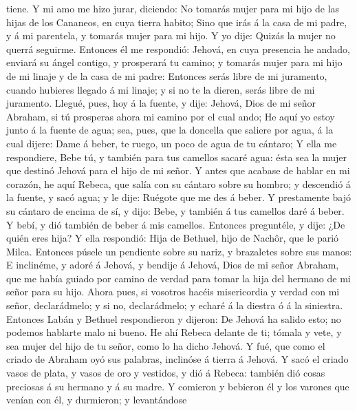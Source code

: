 tiene.  Y mi amo me hizo jurar, diciendo: No tomarás
mujer para mi hijo de las hijas de los Cananeos, en cuya tierra habito;
 Sino que irás á la casa de mi padre, y á mi parentela, y
tomarás mujer para mi hijo.  Y yo dije: Quizás la mujer
no querrá seguirme.  Entonces él me respondió: Jehová, en
cuya presencia he andado, enviará su ángel contigo, y prosperará tu
camino; y tomarás mujer para mi hijo de mi linaje y de la casa de mi
padre:  Entonces serás libre de mi juramento, cuando
hubieres llegado á mi linaje; y si no te la dieren, serás libre de mi
juramento.  Llegué, pues, hoy á la fuente, y dije:
Jehová, Dios de mi señor Abraham, si tú prosperas ahora mi camino por el
cual ando;  He aquí yo estoy junto á la fuente de agua;
sea, pues, que la doncella que saliere por agua, á la cual dijere: Dame
á beber, te ruego, un poco de agua de tu cántaro;  Y ella
me respondiere, Bebe tú, y también para tus camellos sacaré agua: ésta
sea la mujer que destinó Jehová para el hijo de mi señor.
 Y antes que acabase de hablar en mi corazón, he aquí
Rebeca, que salía con su cántaro sobre su hombro; y descendió á la
fuente, y sacó agua; y le dije: Ruégote que me des á beber.
 Y prestamente bajó su cántaro de encima de sí, y dijo:
Bebe, y también á tus camellos daré á beber. Y bebí, y dió también de
beber á mis camellos.  Entonces preguntéle, y dije: ¿De
quién eres hija? Y ella respondió: Hija de Bethuel, hijo de Nachôr, que
le parió Milca. Entonces púsele un pendiente sobre su nariz, y
brazaletes sobre sus manos:  E inclinéme, y adoré á
Jehová, y bendije á Jehová, Dios de mi señor Abraham, que me había
guiado por camino de verdad para tomar la hija del hermano de mi señor
para su hijo.  Ahora pues, si vosotros hacéis
misericordia y verdad con mi señor, declarádmelo; y si no, declarádmelo;
y echaré á la diestra ó á la siniestra.  Entonces Labán y
Bethuel respondieron y dijeron: De Jehová ha salido esto; no podemos
hablarte malo ni bueno.  He ahí Rebeca delante de ti;
tómala y vete, y sea mujer del hijo de tu señor, como lo ha dicho
Jehová.  Y fué, que como el criado de Abraham oyó sus
palabras, inclinóse á tierra á Jehová.  Y sacó el criado
vasos de plata, y vasos de oro y vestidos, y dió á Rebeca: también dió
cosas preciosas á su hermano y á su madre.  Y comieron y
bebieron él y los varones que venían con él, y durmieron; y levantándose
